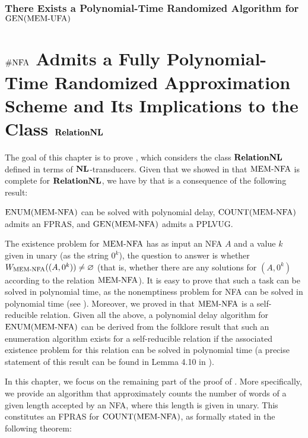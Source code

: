 \documentclass[11pt,twoside=off,numbers=noenddot]{scrbook}
\begin{document}
\subsection{There Exists a Polynomial-Time Randomized Algorithm for $\text{GEN}(\text{MEM-UFA})$}

\chapter{$\text{\#NFA}$ Admits a Fully Polynomial-Time Randomized Approximation Scheme and Its Implications to the Class $\textbf{RelationNL}$}
The goal of this chapter is to prove , which considers the class $\textbf{RelationNL}$ defined in terms of $\textbf{NL}$-transducers. Given that we showed in  that $\text{MEM-NFA}$ is complete for $\textbf{RelationNL}$, we have by  that  is a consequence of the following result:

\begin{theorem}
    $\text{ENUM}(\text{MEM-NFA})$ can be solved with polynomial delay, $\text{COUNT}(\text{MEM-NFA})$ admits an FPRAS, and $\text{GEN}(\text{MEM-NFA})$ admits a PPLVUG.
\end{theorem}

The existence problem for $\text{MEM-NFA}$ has as input an NFA $A$ and a value $k$ given in unary (as the string $0^k$), the question to answer is whether $W_{\text{MEM-NFA}}((A, 0^k)) \neq \varnothing$ (that is, whether there are any solutions for $(A, 0^k)$ according to the relation $\text{MEM-NFA}$). It is easy to prove that such a task can be solved in polynomial time, as the nonemptiness problem for NFA can be solved in polynomial time (see \cite{hopcroft2001introduction}). Moreover, we proved in  that $\text{MEM-NFA}$ is a self-reducible relation. Given all the above, a polynomial delay algorithm for $\text{ENUM}(\text{MEM-NFA})$ can be derived from the folklore result that such an enumeration algorithm exists for a self-reducible relation if the associated existence problem for this relation can be solved in polynomial time (a precise statement of this result can be found in Lemma 4.10 in \cite{schmidt2009enumeration}).

In this chapter, we focus on the remaining part of the proof of . More specifically, we provide an algorithm that approximately counts the number of words of a given length accepted by an NFA, where this length is given in unary. This constitutes an FPRAS for $\text{COUNT}(\text{MEM-NFA})$, as formally stated in the following theorem:
\end{document}
